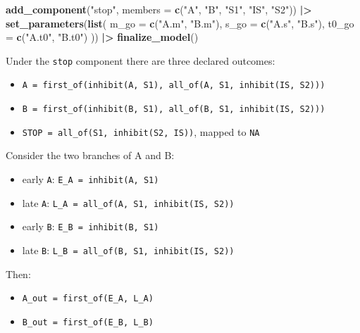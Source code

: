 \documentclass[
]{article}
\newenvironment{Shaded}{\begin{snugshade}}{\end{snugshade}}
\newcommand{\AttributeTok}[1]{\textcolor[rgb]{0.13,0.29,0.53}{#1}}
\newcommand{\FunctionTok}[1]{\textcolor[rgb]{0.13,0.29,0.53}{\textbf{#1}}}
\newcommand{\NormalTok}[1]{#1}
\newcommand{\SpecialCharTok}[1]{\textcolor[rgb]{0.81,0.36,0.00}{\textbf{#1}}}
\newcommand{\StringTok}[1]{\textcolor[rgb]{0.31,0.60,0.02}{#1}}
\providecommand{\tightlist}{%
  \setlength{\itemsep}{0pt}\setlength{\parskip}{0pt}}
\begin{document}
\begin{Shaded}
\begin{Highlighting}[]
  \FunctionTok{add\_component}\NormalTok{(}\StringTok{"stop"}\NormalTok{, }\AttributeTok{members =} \FunctionTok{c}\NormalTok{(}\StringTok{"A"}\NormalTok{, }\StringTok{"B"}\NormalTok{, }\StringTok{"S1"}\NormalTok{, }\StringTok{"IS"}\NormalTok{, }\StringTok{"S2"}\NormalTok{)) }\SpecialCharTok{|\textgreater{}}
  \FunctionTok{set\_parameters}\NormalTok{(}\FunctionTok{list}\NormalTok{(}
    \AttributeTok{m\_go =} \FunctionTok{c}\NormalTok{(}\StringTok{"A.m"}\NormalTok{, }\StringTok{"B.m"}\NormalTok{),}
    \AttributeTok{s\_go =} \FunctionTok{c}\NormalTok{(}\StringTok{"A.s"}\NormalTok{, }\StringTok{"B.s"}\NormalTok{),}
    \AttributeTok{t0\_go =} \FunctionTok{c}\NormalTok{(}\StringTok{"A.t0"}\NormalTok{, }\StringTok{"B.t0"}\NormalTok{)}
\NormalTok{  )) }\SpecialCharTok{|\textgreater{}}
  \FunctionTok{finalize\_model}\NormalTok{()}
\end{Highlighting}
\end{Shaded}

Under the \texttt{stop} component there are three declared outcomes:

\begin{itemize}
\tightlist
\item
  \texttt{A\ =\ first\_of(inhibit(A,\ S1),\ all\_of(A,\ S1,\ inhibit(IS,\ S2)))}
\item
  \texttt{B\ =\ first\_of(inhibit(B,\ S1),\ all\_of(B,\ S1,\ inhibit(IS,\ S2)))}
\item
  \texttt{STOP\ =\ all\_of(S1,\ inhibit(S2,\ IS))}, mapped to
  \texttt{NA}
\end{itemize}

Consider the two branches of A and B:

\begin{itemize}
\tightlist
\item
  early \texttt{A}: \texttt{E\_A\ =\ inhibit(A,\ S1)}
\item
  late \texttt{A}: \texttt{L\_A\ =\ all\_of(A,\ S1,\ inhibit(IS,\ S2))}
\item
  early \texttt{B}: \texttt{E\_B\ =\ inhibit(B,\ S1)}
\item
  late \texttt{B}: \texttt{L\_B\ =\ all\_of(B,\ S1,\ inhibit(IS,\ S2))}
\end{itemize}

Then:

\begin{itemize}
\tightlist
\item
  \texttt{A\_out\ =\ first\_of(E\_A,\ L\_A)}
\item
  \texttt{B\_out\ =\ first\_of(E\_B,\ L\_B)}
\end{itemize}
\end{document}
